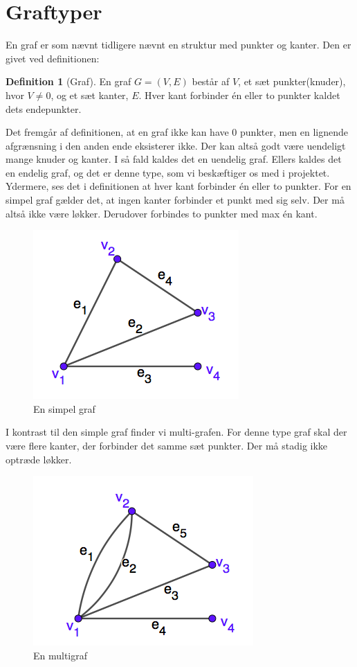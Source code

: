 \documentclass[11pt,a4paper,twoside,openright,danish]{book}
\theoremstyle{definition}
\newtheorem{definition}
{Definition}[section]
\begin{document}
\section{Graftyper}
En graf er som nævnt tidligere nævnt en struktur med punkter og kanter. Den er givet ved definitionen:
\begin{definition}
[Graf] 
En graf $G=(V,E)$ består af $V$, et sæt punkter(knuder), hvor $V\neq0$, og et sæt kanter, $E$. Hver kant forbinder én eller to punkter kaldet dets endepunkter.
\end{definition}
Det fremgår af definitionen, at en graf ikke kan have 0 punkter, men en lignende afgrænsning i den anden ende eksisterer ikke. Der kan altså godt være uendeligt mange knuder og kanter. I så fald kaldes det en uendelig graf. Ellers kaldes det en endelig graf, og det er denne type, som vi beskæftiger os med i projektet.
Ydermere, ses det i definitionen at hver kant forbinder én eller to punkter. For en simpel graf gælder det, at ingen kanter forbinder et punkt med sig selv. Der må altså ikke være løkker. Derudover forbindes to punkter med max én kant.
\begin{figure}[H]
\centering
\includegraphics[scale=0.5]{simpel_graf.png}
\caption{En simpel graf}
\label{fig:simpel}
\end{figure}
I kontrast til den simple graf finder vi multi-grafen. For denne type graf skal der være flere kanter, der forbinder det samme sæt punkter. Der må stadig ikke optræde løkker.
\begin{figure}[H]
\centering
\includegraphics[scale=0.5]{multigraf.png} 
\caption{En multigraf}
\label{fig:multi}
\end{figure}
\end{document}

